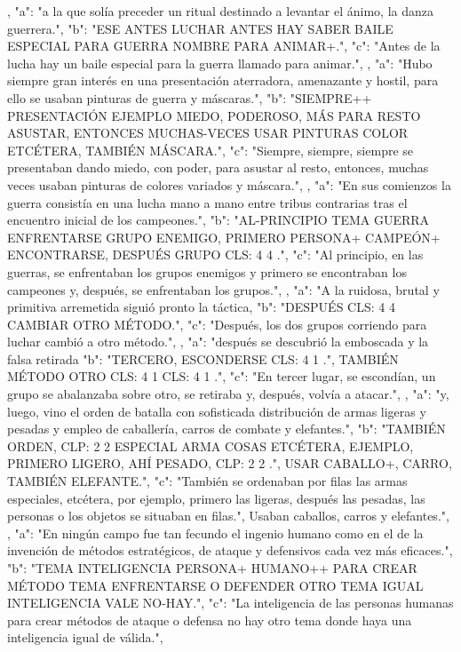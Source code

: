 ,
{
"a": "a la que solía preceder un ritual destinado a levantar el ánimo, la danza guerrera.",
"b": "ESE ANTES LUCHAR ANTES HAY SABER BAILE ESPECIAL PARA GUERRA NOMBRE PARA ANIMAR+.",
"c": "Antes de la lucha hay un baile especial para la guerra llamado para animar.",
}
,
{
"a": "Hubo siempre gran interés en una presentación aterradora, amenazante y hostil, para ello se usaban pinturas de guerra y máscaras.",
"b": "SIEMPRE++ PRESENTACIÓN EJEMPLO MIEDO, PODEROSO, MÁS PARA RESTO ASUSTAR, ENTONCES MUCHAS-VECES USAR PINTURAS COLOR ETCÉTERA, TAMBIÉN MÁSCARA.",
"c": "Siempre, siempre, siempre se presentaban dando miedo, con poder, para asustar al resto, entonces, muchas veces usaban pinturas de colores variados y máscara.",
}
,
{
"a": "En sus comienzos la guerra consistía en una lucha mano a mano entre tribus contrarias tras el encuentro inicial de los campeones.",
"b": "AL-PRINCIPIO TEMA GUERRA ENFRENTARSE GRUPO ENEMIGO, PRIMERO PERSONA+ CAMPEÓN+ ENCONTRARSE, DESPUÉS GRUPO CLS: 4 4 .",
"c": "Al principio, en las guerras, se enfrentaban los grupos enemigos y primero se encontraban los campeones y, después, se enfrentaban los grupos.",
}
,
{
"a": "A la ruidosa, brutal y primitiva arremetida siguió pronto la táctica,
"b": "DESPUÉS CLS: 4 4  CAMBIAR OTRO MÉTODO.",
"c": "Después, los dos grupos corriendo para luchar cambió a otro método.",
}
,
{
"a": "después se descubrió la emboscada y la falsa retirada
"b": "TERCERO, ESCONDERSE CLS: 4 1 .", TAMBIÉN MÉTODO OTRO CLS: 4 1  CLS: 4 1 .",
"c": "En tercer lugar, se escondían, un grupo se abalanzaba sobre otro, se retiraba y, después, volvía a atacar.",
}
,
{
"a": "y, luego, vino el orden de batalla con sofisticada distribución de armas ligeras y pesadas y empleo de caballería, carros de combate y elefantes.",
"b": "TAMBIÉN ORDEN, CLP: 2 2  ESPECIAL ARMA COSAS ETCÉTERA, EJEMPLO, PRIMERO LIGERO, AHÍ PESADO, CLP: 2 2 .", USAR CABALLO+, CARRO, TAMBIÉN ELEFANTE.",
"c": "También se ordenaban por filas las armas especiales, etcétera, por ejemplo, primero las ligeras, después las pesadas, las personas o los objetos se situaban en filas.", Usaban caballos, carros y elefantes.",
}
,
{
"a": "En ningún campo fue tan fecundo el ingenio humano como en el de la invención de métodos estratégicos, de ataque y defensivos cada vez más eficaces.",
"b": "TEMA INTELIGENCIA PERSONA+ HUMANO++ PARA CREAR MÉTODO TEMA ENFRENTARSE O DEFENDER OTRO TEMA IGUAL INTELIGENCIA VALE NO-HAY.",
"c": "La inteligencia de las personas humanas para crear métodos de ataque o defensa no hay otro tema donde haya una inteligencia igual de válida.",
}
